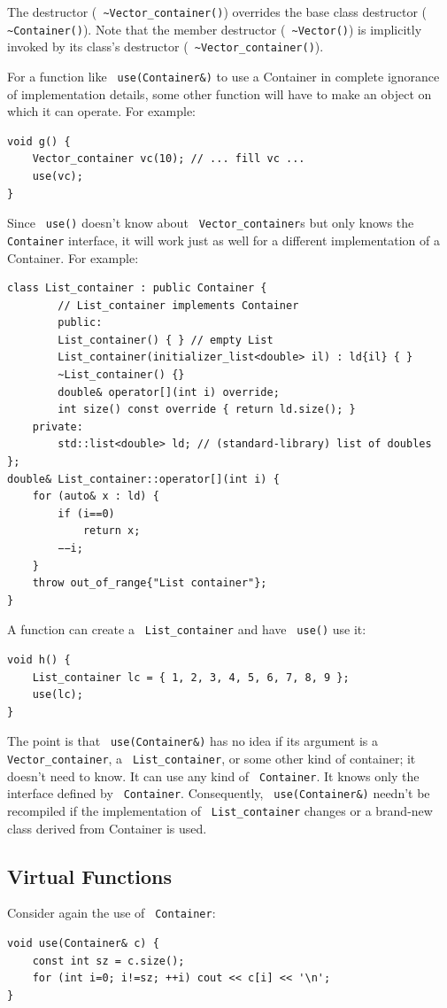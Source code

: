 \documentclass[11pt]{article}
\let\OldTexttt\texttt
\renewcommand{\texttt}[1]{\OldTexttt{\color{MidnightBlue} #1}}
\begin{document}
The destructor (\texttt{\textasciitilde{}Vector\_container()}) overrides the base class destructor (\texttt{\textasciitilde{}Container()}). Note
that the member destructor (\texttt{\textasciitilde{}Vector()}) is implicitly invoked by its class's destructor
(\texttt{\textasciitilde{}Vector\_container()}).

For a function like \texttt{use(Container\&)} to use a Container in complete ignorance of implementation
details, some other function will have to make an object on which it can operate. For example:
\begin{verbatim}
void g() {
    Vector_container vc(10); // ... fill vc ...
    use(vc);
}
\end{verbatim}

Since \texttt{use()} doesn’t know about \texttt{Vector\_container}​s but only knows the \texttt{Container} interface, it will
work just as well for a different implementation of a Container. For example:
\begin{verbatim}
class List_container : public Container {
        // List_container implements Container 
        public:
        List_container() { } // empty List 
        List_container(initializer_list<double> il) : ld{il} { }
        ~List_container() {}
        double& operator[](int i) override;
        int size() const override { return ld.size(); }
    private:
        std::list<double> ld; // (standard-library) list of doubles
};
double& List_container::operator[](int i) {
    for (auto& x : ld) {
        if (i==0)
            return x;
        −−i;
    }
    throw out_of_range{"List container"};
}
\end{verbatim}

A function can create a \texttt{List\_container} and have \texttt{use()} use it:
\begin{verbatim}
void h() {
    List_container lc = { 1, 2, 3, 4, 5, 6, 7, 8, 9 };
    use(lc);
}
\end{verbatim}

The point is that \texttt{use(Container\&)} has no idea if its argument is a \texttt{Vector\_container}, a
\texttt{List\_container}, or some other kind of container; it doesn’t need to know. It can use any kind of
\texttt{Container}. It knows only the interface defined by \texttt{Container}. Consequently, \texttt{use(Container\&)}
needn’t be recompiled if the implementation of \texttt{List\_container} changes or a brand-new class
derived from Container is used.
\subsection{Virtual Functions}
\label{sec:org63ee07c}
Consider again the use of \texttt{Container}:
\begin{verbatim}
void use(Container& c) {
    const int sz = c.size();
    for (int i=0; i!=sz; ++i) cout << c[i] << '\n';
}
\end{verbatim}
\end{document}
